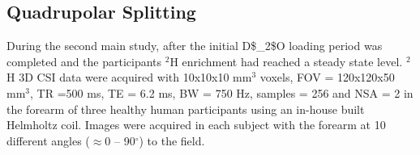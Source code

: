 


\subsection{Quadrupolar Splitting}

During the second main study, after the initial \ac{D$_2$O} loading period was completed and the participants $^2$H enrichment had reached a steady state level. $^2$H 3D \ac{CSI} data were acquired with 10x10x10 mm$^3$ voxels, \ac{FOV} = 120x120x50 mm$^3$, \ac{TR} =500 ms, \ac{TE} = 6.2 ms, \ac{BW} = 750 Hz, samples = 256 and NSA = 2 in the forearm of three healthy human participants using an in-house built Helmholtz coil. Images were acquired in each subject with the forearm at 10 different angles ($\approx$0 – 90$^\circ$) to the field. 


